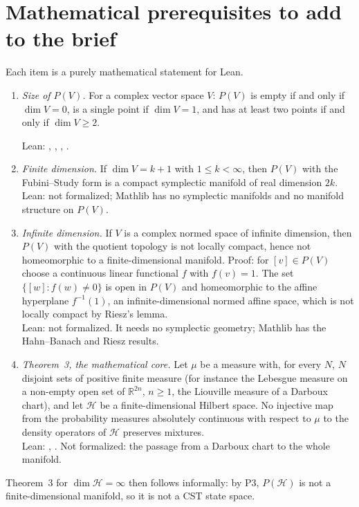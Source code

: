 \documentclass[11pt]{article}
\begin{document}
\section{Mathematical prerequisites to add to the brief}
Each item is a purely mathematical statement for Lean.
\begin{enumerate}
\item[P1.] \emph{Size of $P(V)$.} For a complex vector space $V$: $P(V)$ is empty if and only if
  $\dim V = 0$, is a single point if $\dim V = 1$, and has at least two points if and only if
  $\dim V \ge 2$.\par{\raggedright
  Lean: , ,
  , .\par}
\item[P2.] \emph{Finite dimension.} If $\dim V = k + 1$ with $1 \le k < \infty$, then $P(V)$
  with the Fubini--Study form is a compact symplectic manifold of real dimension $2k$.\\
  Lean: not formalized; Mathlib has no symplectic manifolds and no manifold structure on
  $P(V)$.
\item[P3.] \emph{Infinite dimension.} If $V$ is a complex normed space of infinite dimension,
  then $P(V)$ with the quotient topology is not locally compact, hence not homeomorphic to a
  finite-dimensional manifold. Proof: for $[v] \in P(V)$ choose a continuous linear functional
  $f$ with $f(v) = 1$. The set $\{[w] : f(w) \ne 0\}$ is open in $P(V)$ and homeomorphic to the
  affine hyperplane $f^{-1}(1)$, an infinite-dimensional normed affine space, which is not
  locally compact by Riesz's lemma.\\
  Lean: not formalized. It needs no symplectic geometry; Mathlib has the Hahn--Banach and Riesz
  results.
\item[P4.] \emph{Theorem~3, the mathematical core.} Let $\mu$ be a measure with, for every $N$,
  $N$ disjoint sets of positive finite measure (for instance the Lebesgue measure on a non-empty
  open set of $\mathbb R^{2n}$, $n \ge 1$, the Liouville measure of a Darboux chart), and let
  $\mathcal H$ be a finite-dimensional Hilbert space. No injective map from the probability
  measures absolutely continuous with respect to $\mu$ to the density operators of
  $\mathcal H$ preserves mixtures.\\
  Lean: , . Not formalized:
  the passage from a Darboux chart to the whole manifold.
\end{enumerate}
Theorem~3 for $\dim\mathcal H = \infty$ then follows informally: by P3, $P(\mathcal H)$ is not a
finite-dimensional manifold, so it is not a CST state space.
\end{document}
